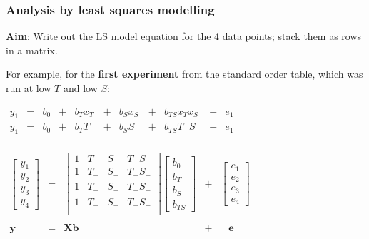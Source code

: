 \begin{frame}\frametitle{Analysis by least squares modelling}
	\textbf{Aim}: Write out the LS model equation for the 4 data points; stack them as rows in a matrix.
	
	\vspace{12pt}
	For example, for the \textbf{first experiment} from the standard order table, which was run at low $T$ and low $S$:
	
	\begin{center}
		$
		\begin{array}{rcccccccccc}
			y_1 &= &b_0 &+ &b_Tx_T    &+ &b_S x_S   &+ &b_{TS} x_Tx_S     &+ &e_1\\
			y_1 &= &b_0 &+ &b_T T_{-} &+ &b_S S_{-} &+ &b_{TS} T_{-}S_{-} &+ &e_1\\
		\end{array}
		$
	
		\vspace{12pt}
		$
		\begin{array}{rcccl}
			\begin{bmatrix}
				y_1\\
				y_2\\
				y_3 \\
				y_4
			\end{bmatrix}
			&=&
			\begin{bmatrix}
				1 & T_{-} & S_{-} & T_{-}S_{-}\\
				1 & T_{+} & S_{-} & T_{+}S_{-}\\
				1 & T_{-} & S_{+} & T_{-}S_{+}\\
				1 & T_{+} & S_{+} & T_{+}S_{+}\\
			\end{bmatrix}
			\begin{bmatrix}
				b_0 \\
				b_T \\
				b_S \\
				b_{TS}
			\end{bmatrix}
			&+&
			\begin{bmatrix}
				e_1\\
				e_2\\
				e_3 \\
				e_4
			\end{bmatrix}\
			\\
			\\
			\mathbf{y} &=& \mathbf{X} \mathbf{b} &+& \,\,\,\,\,\mathbf{e} \\
		\end{array}
		$
	\end{center}
\end{frame}

